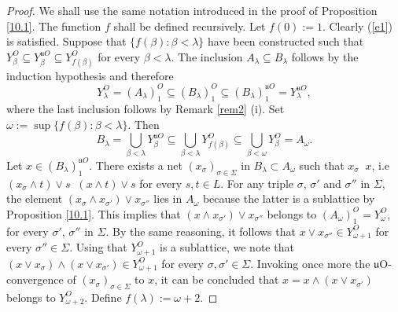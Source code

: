 \documentclass[12pt,a4paper]{amsart}
\numberwithin{equation}{section}
\theoremstyle{definition}
\newcommand{\sss}[1]{{\scriptscriptstyle #1}}
\newcommand{\converges}[1]{\mathop{\overset{\text{#1}}{\longrightarrow}}}
\begin{document}
\begin{proof}
We shall use the same notation introduced in the proof of Proposition \ref{10.1}.  The function $f$ shall be defined recursively.
Let $f(0):=1$.  Clearly (\ref{e1}) is satisfied.  Suppose that $\{f(\beta):\beta<\lambda\}$ have been constructed such that $Y^{\sss{O}}_\beta\subseteq Y^{\sss{{\mathfrak{u}O}}}_\beta\subseteq Y^{\sss{O}}_{f(\beta)}$ for every $\beta<\lambda$. The inclusion $A_{\lambda}\subseteq B_{\lambda}$ follows by the induction hypothesis and therefore
\[Y^{\sss{O}}_\lambda=(A_\lambda)^{\sss{O}}_1\subseteq (B_\lambda)^{\sss{O}}_1\subseteq (B_\lambda)^{\sss{\mathfrak{u}O}}_1=Y^{\sss{\mathfrak{u}O}}_\lambda,\]
where the last inclusion follows by Remark \ref{rem2} {\rm(i)}. Set $\omega:=\sup\{f(\beta):\beta<\lambda\}$. Then
\[B_\lambda=\bigcup_{\beta<\lambda}Y_\beta^{\sss{\mathfrak{u}O}}\subseteq\bigcup_{\beta<\lambda}Y_{f(\beta)}^{\sss{O}}\subseteq\bigcup_{\beta<\omega}Y^{\sss{O}}_\beta=A_\omega.\]
 Let $x\in (B_{\lambda})^{\sss{\mathfrak u}O}_1$.  There exists a net $(x_{\sigma})_{\sigma \in \Sigma}$ in $B_\lambda\subset A_\omega$ such that $x_{\sigma} \converges{{$\mathfrak{u}O$}} x$, i.e  $(x_{\sigma} \wedge t) \vee s \converges{O} (x \wedge t) \vee s$ for every $s,t \in  L$. For any triple $\sigma$, $\sigma'$ and $\sigma''$ in $\Sigma$, the element $(x_\sigma\wedge x_{\sigma'})\vee x_{\sigma''}$ lies in $A_\omega$ because the latter is a sublattice by Proposition \ref{10.1}. This implies that $(x\wedge x_{\sigma'})\vee x_{\sigma''}$ belongs to $(A_\omega)^{\sss{O}}_1=Y^{\sss{O}}_{\omega}$, for every $\sigma'$, $\sigma''$ in $\Sigma$.  By the same reasoning, it follows that $x\vee x_{\sigma''}\in Y^{\sss{O}}_{\omega+1}$ for every $\sigma''\in\Sigma$.  Using that $Y^{\sss{O}}_{\omega+1}$ is a sublattice, we note that $(x\vee x_{\sigma})\wedge(x\vee x_{\sigma'})\in Y^{\sss{O}}_{\omega+1}$ for every $\sigma,\sigma'\in\Sigma$.  Invoking once more the $\mathfrak{u}$O-convergence of $(x_\sigma)_{\sigma\in\Sigma}$ to $x$, it can be concluded that 
 $x=x\wedge(x\vee x_{\sigma'})$ belongs to $Y^{\sss{O}}_{\omega+2}$.  Define $f(\lambda):=\omega+2$.
\end{proof}
\end{document}
